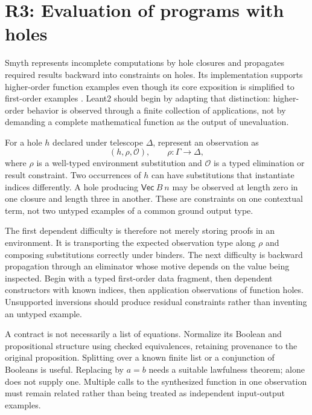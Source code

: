 \section{R3: Evaluation of programs with holes}\label{sec:r3}


Smyth represents incomplete computations by hole closures and propagates
required results backward into constraints on holes. Its implementation
supports higher-order function examples even though its core exposition is
simplified to first-order examples \cite{smyth}. Leant2 should begin by
adapting that distinction: higher-order behavior is observed through a finite
collection of applications, not by demanding a complete mathematical function
as the output of unevaluation.

For a hole $h$ declared under telescope $\Delta$, represent an observation as
\[
 (h,\rho,\mathcal O),\qquad
 \rho:\Gamma\longrightarrow\Delta,
 \tag{6}\label{eq:closure}
\]
where $\rho$ is a well-typed environment substitution and $\mathcal O$ is a
typed elimination or result constraint. Two occurrences of $h$ can have
substitutions that instantiate indices differently. A hole producing
$\mathsf{Vec}\ B\ n$ may be observed at length zero in one closure and length
three in another. These are constraints on one contextual term, not two
untyped examples of a common ground output type.

The first dependent difficulty is therefore not merely storing proofs in an
environment. It is transporting the expected observation type along $\rho$
and composing substitutions correctly under binders. The next difficulty is
backward propagation through an eliminator whose motive depends on the value
being inspected. Begin with a typed first-order data fragment, then dependent
constructors with known indices, then application observations of function
holes. Unsupported inversions should produce residual constraints rather than
inventing an untyped example.

A contract is not necessarily a list of equations. Normalize its Boolean and
propositional structure using checked equivalences, retaining provenance to
the original proposition. Splitting  over a known finite list
or a conjunction of Booleans is useful. Replacing  by
$a=b$ needs a suitable lawfulness theorem;  alone does not supply
one. Multiple calls to the synthesized function in one observation must remain
related rather than being treated as independent input-output examples.

